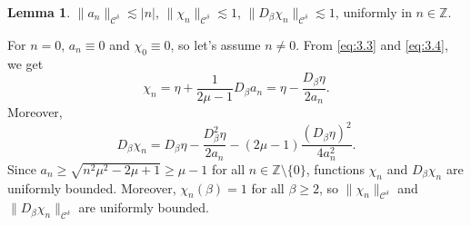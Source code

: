 \documentclass[11pt]{article}
\makeatletter
\renewenvironment{proof}[1][\proofname]{\par
  \vspace{-.7\topsep}%
  \pushQED{\qed}%
  \normalfont
  \topsep0pt \partopsep0pt %
  \trivlist
  \item[\hskip\labelsep
        \itshape
    #1\@addpunct{.}]\ignorespaces
}{%
  \popQED\endtrivlist\@endpefalse
  \addvspace{6pt plus 6pt} %
}
\theoremstyle{definition}
\newtheorem{lemma}[theorem]{Lemma}
\theoremstyle{remark}
\numberwithin{equation}{section}
\newcommand{\mbb}{\mathbb}
\newcommand{\mcal}{\mathcal}
\newcommand{\Z}{\mbb{Z}}
\newcommand{\norm}[1]{\lVert #1 \rVert}
\makeatother
\begin{document}
\begin{lemma} \label{lem:3.4}
$\norm{a_n}_{\mcal{C}^\delta} \lesssim |n|$, $\norm{\chi_n}_{\mcal{C}^\delta} \lesssim 1$, $\norm{D_\beta \chi_n}_{\mcal{C}^\delta} \lesssim 1$, uniformly in $n\in\Z$.
\end{lemma}
\begin{proof}
For $n=0$, $a_n \equiv 0$ and $\chi_0 \equiv 0$, so let's assume $n\neq 0$. From \eqref{eq:3.3} and \eqref{eq:3.4}, we get
\[\chi_n = \eta + \frac{1}{2\mu - 1} D_\beta a_n = \eta - \frac{D_\beta \eta}{2a_n}.\]
Moreover,
\[D_\beta \chi_n = D_\beta \eta - \frac{D_\beta^2 \eta}{2a_n} - (2\mu - 1) \frac{(D_\beta \eta)^2}{4a_n^2}.\]
Since $a_n \geq \sqrt{n^2\mu^2 - 2\mu +1} \geq \mu - 1$ for all $n\in \Z \setminus\{0\}$, functions $\chi_n$ and $D_\beta \chi_n$ are uniformly bounded. Moreover, $\chi_n (\beta) = 1$ for all $\beta \geq 2$, so $\norm{\chi_n}_{\mcal{C}^\delta}$ and $\norm{D_\beta \chi_n}_{\mcal{C}^\delta}$ are uniformly bounded.
\end{proof}
\end{document}
